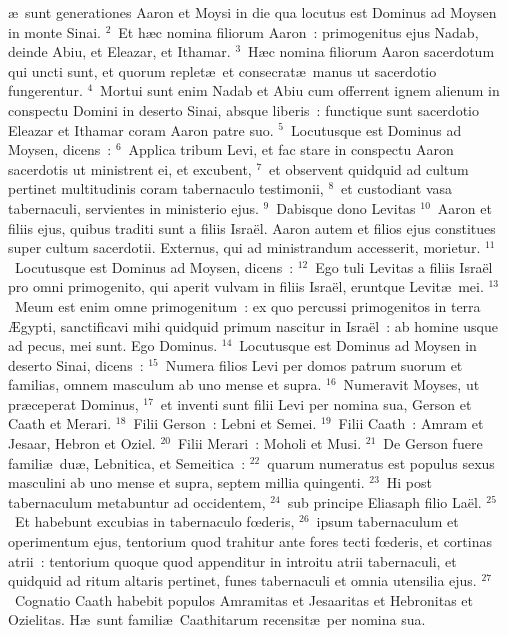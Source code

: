 \bchapter
{}\ae\ sunt generationes Aaron et Moysi in die qua locutus est Dominus ad Moysen in monte Sinai.
${}^{2}$~Et h\ae c nomina filiorum Aaron~: primogenitus ejus Nadab, deinde Abiu, et Eleazar, et Ithamar.
${}^{3}$~H\ae c nomina filiorum Aaron sacerdotum qui uncti sunt, et quorum replet\ae\ et consecrat\ae\ manus ut sacerdotio fungerentur.
${}^{4}$~Mortui sunt enim Nadab et Abiu cum offerrent ignem alienum in conspectu Domini in deserto Sinai, absque liberis~: functique sunt sacerdotio Eleazar et Ithamar coram Aaron patre suo.
${}^{5}$~Locutusque est Dominus ad Moysen, dicens~:
${}^{6}$~Applica tribum Levi, et fac stare in conspectu Aaron sacerdotis ut ministrent ei, et excubent,
${}^{7}$~et observent quidquid ad cultum pertinet multitudinis coram tabernaculo testimonii,
${}^{8}$~et custodiant vasa tabernaculi, servientes in ministerio ejus.
${}^{9}$~Dabisque dono Levitas
${}^{10}$~Aaron et filiis ejus, quibus traditi sunt a filiis Isra\"el. Aaron autem et filios ejus constitues super cultum sacerdotii. Externus, qui ad ministrandum accesserit, morietur.
${}^{11}$~Locutusque est Dominus ad Moysen, dicens~:
${}^{12}$~Ego tuli Levitas a filiis Isra\"el pro omni primogenito, qui aperit vulvam in filiis Isra\"el, eruntque Levit\ae\ mei.
${}^{13}$~Meum est enim omne primogenitum~: ex quo percussi primogenitos in terra \AE gypti, sanctificavi mihi quidquid primum nascitur in Isra\"el~: ab homine usque ad pecus, mei sunt. Ego Dominus.
${}^{14}$~Locutusque est Dominus ad Moysen in deserto Sinai, dicens~:
${}^{15}$~Numera filios Levi per domos patrum suorum et familias, omnem masculum ab uno mense et supra.
${}^{16}$~Numeravit Moyses, ut pr\ae ceperat Dominus,
${}^{17}$~et inventi sunt filii Levi per nomina sua, Gerson et Caath et Merari.
${}^{18}$~Filii Gerson~: Lebni et Semei.
${}^{19}$~Filii Caath~: Amram et Jesaar, Hebron et Oziel.
${}^{20}$~Filii Merari~: Moholi et Musi.
${}^{21}$~De Gerson fuere famili\ae\ du\ae , Lebnitica, et Semeitica~:
${}^{22}$~quarum numeratus est populus sexus masculini ab uno mense et supra, septem millia quingenti.
${}^{23}$~Hi post tabernaculum metabuntur ad occidentem,
${}^{24}$~sub principe Eliasaph filio La\"el.
${}^{25}$~Et habebunt excubias in tabernaculo fœderis,
${}^{26}$~ipsum tabernaculum et operimentum ejus, tentorium quod trahitur ante fores tecti fœderis, et cortinas atrii~: tentorium quoque quod appenditur in introitu atrii tabernaculi, et quidquid ad ritum altaris pertinet, funes tabernaculi et omnia utensilia ejus.
${}^{27}$~Cognatio Caath habebit populos Amramitas et Jesaaritas et Hebronitas et Ozielitas. H\ae\ sunt famili\ae\ Caathitarum recensit\ae\ per nomina sua.
